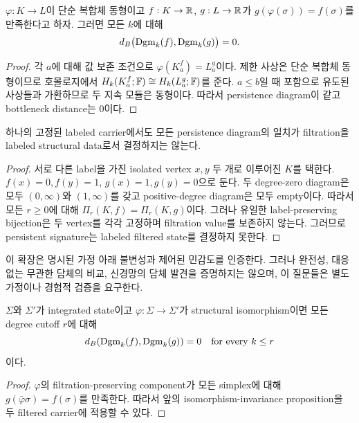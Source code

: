 \begin{proposition}
$\varphi:K\to L$이 단순 복합체 동형이고 $f:K\to\mathbb{R}$, $g:L\to\mathbb{R}$가
$g(\varphi(\sigma))=f(\sigma)$를 만족한다고 하자. 그러면 모든 $k$에 대해
\[
 d_B\bigl(\operatorname{Dgm}_k(f),\operatorname{Dgm}_k(g)\bigr)=0.
\]
\end{proposition}

\begin{proof}
각 $a$에 대해 값 보존 조건으로 $\varphi(K_a^f)=L_a^g$이다. 제한 사상은
단순 복합체 동형이므로 호몰로지에서 $H_k(K_a^f;\mathbb{F})\cong
H_k(L_a^g;\mathbb{F})$를 준다. $a\leq b$일 때 포함으로 유도된 사상들과
가환하므로 두 지속 모듈은 동형이다. 따라서 persistence diagram이 같고
bottleneck distance는 0이다.
\end{proof}

\begin{proposition}
하나의 고정된 labeled carrier에서도 모든 persistence diagram의 일치가
filtration을 labeled structural data로서 결정하지는 않는다.
\end{proposition}

\begin{proof}
서로 다른 label을 가진 isolated vertex $x,y$ 두 개로 이루어진 $K$를 택한다.
$f(x)=0,f(y)=1$, $g(x)=1,g(y)=0$으로 둔다. 두 degree-zero diagram은 모두
$(0,\infty)$와 $(1,\infty)$를 갖고 positive-degree diagram은 모두 empty이다.
따라서 모든 $r\geq0$에 대해 $\Pi_r(K,f)=\Pi_r(K,g)$이다. 그러나 유일한
label-preserving bijection은 두 vertex를 각각 고정하며 filtration value를
보존하지 않는다. 그러므로 persistent signature는 labeled filtered state를
결정하지 못한다.
\end{proof}


이 확장은 명시된 가정 아래 불변성과 제어된 민감도를 인증한다. 그러나
완전성, 대응 없는 무관한 담체의 비교, 신경망의 담체 발견을 증명하지는
않으며, 이 질문들은 별도 가정이나 경험적 검증을 요구한다.


\begin{proposition}
$\Sigma$와 $\Sigma'$가 integrated state이고
$\varphi:\Sigma\to\Sigma'$가 structural isomorphism이면 모든 degree cutoff
$r$에 대해
\[
d_B(\operatorname{Dgm}_k(f),\operatorname{Dgm}_k(g))=0\quad\text{for every }k\leq r
\]
이다.
\end{proposition}

\begin{proof}
$\varphi$의 filtration-preserving component가 모든 simplex에 대해
$g(\bar\varphi\sigma)=f(\sigma)$를 만족한다. 따라서 앞의
isomorphism-invariance proposition을 두 filtered carrier에 적용할 수 있다.
\end{proof}
